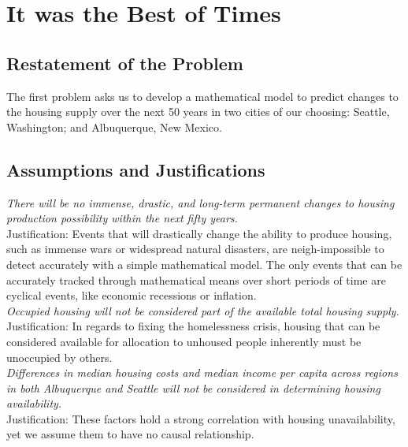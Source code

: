\documentclass[12pt]{article}
\begin{document}
\newpage

\section{It was the Best of Times}

\subsection{Restatement of the Problem}
The first problem asks us to develop a mathematical model to predict changes to the housing supply over the next 50
years in two cities of our choosing: Seattle, Washington; and Albuquerque, New Mexico.

\subsection{Assumptions and Justifications}

\textit{There will be no immense, drastic, and long-term permanent changes to housing production possibility
within the next fifty years.} \\

\noindent
Justification: Events that will drastically change the ability to produce housing, such as immense wars or widespread
natural disasters, are neigh-impossible to detect accurately with a simple mathematical model. The only events that can
be accurately tracked through mathematical means over short periods of time are cyclical events, like economic
recessions or inflation. \\

\noindent
\textit{Occupied housing will not be considered part of the available total housing supply.} \\

\noindent
Justification: In regards to fixing the homelessness crisis, housing that can be considered available for allocation to
unhoused people inherently must be unoccupied by others. \\

\noindent
\textit{Differences in median housing costs and median income per capita across regions in both Albuquerque and Seattle
will not be considered in determining housing availability.} \\

\noindent
Justification: These factors hold a strong correlation with housing unavailability, yet we assume them to have no
causal relationship. \\
\end{document}
